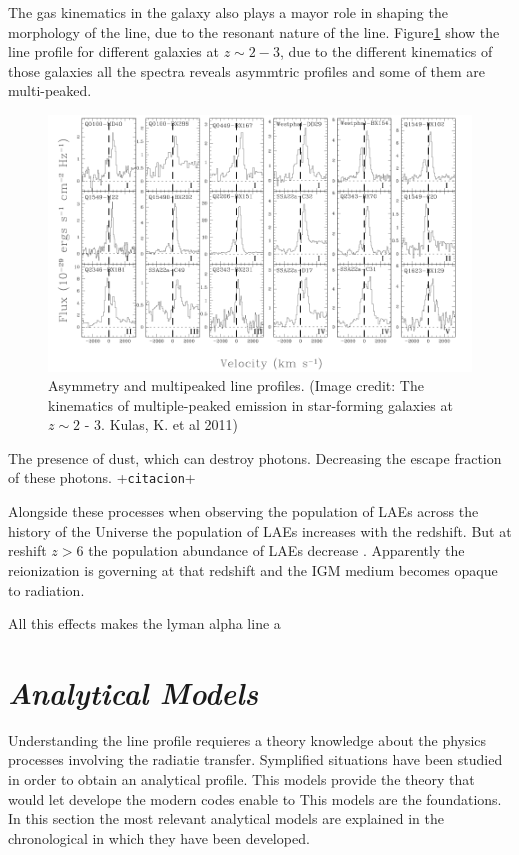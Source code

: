 The gas kinematics in the galaxy also plays a mayor role in shaping
the morphology of the line, due to the resonant nature of the line. 
Figure\ref{fig:kulas} show the \ly line
profile for different galaxies at $z \sim 2 - 3$, due to the different
kinematics of those galaxies all the spectra reveals asymmtric profiles 
and some of them are multi-peaked.    


\begin{figure}[H]\label{fig:kulas}
\begin{center}
\includegraphics[scale=0.4]{../Figures/kulas.png}
\end{center}\caption{Asymmetry and multipeaked \ly line profiles. (Image credit: The kinematics of multiple-peaked \ly emission in star-forming galaxies at $z\sim 2$ - 3. Kulas, K. et al 2011) }
\end{figure}

The presence of dust, which can destroy \ly photons. Decreasing the escape fraction of these photons. +\verb+citacion++

Alongside these processes when observing the population of LAEs across
the history of the Universe  the population of LAEs increases 
with the redshift. But at reshift $z>6$ the  
population abundance of LAEs decrease \citep{Schenker12}. Apparently 
the reionization  is governing at that redshift and the IGM medium 
becomes opaque to \ly radiation.   

All this effects makes the lyman alpha line a  

\section{\emph{Analytical Models}}\label{sec:analytic}

Understanding the \ly line profile requieres a theory knowledge
about the physics processes involving the radiatie transfer. Symplified 
situations have been studied in order to obtain an analytical 
 profile. This models provide the theory that
would let develope the modern codes enable to 
This models are the foundations. In this section the most relevant 
analytical models are explained in the chronological in which 
they have been developed. 

